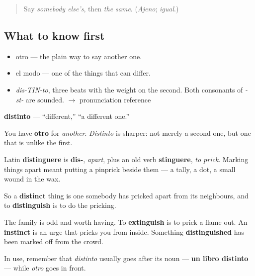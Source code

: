 \label{lesson:ES-C350-distinto}



\begin{quote}
Say \emph{somebody else's}, then \emph{the same}. (\emph{Ajeno}; \emph{igual}.)
\end{quote}

\subsection*{What to know first}
\begin{itemize}
\raggedright
  \item otro — the plain way to say another one.
  \item el modo — one of the things that can differ.
\end{itemize}

\begin{sounds}
\begin{itemize}
\raggedright
  \item \emph{dis-TIN-to}, three beats with the weight on the second. Both consonants of \emph{-st-} are sounded. $\to$ pronunciation reference
\end{itemize}
\end{sounds}

\begin{cousinweb}
\textbf{distinto} — \textquotedblleft{}different,\textquotedblright{} \textquotedblleft{}a different one.\textquotedblright{}

You have \textbf{otro} for \emph{another}. \emph{Distinto} is sharper: not merely a second one, but one that is unlike the first.

Latin \textbf{distinguere} is \textbf{dis-}, \emph{apart}, plus an old verb \textbf{stinguere}, \emph{to prick}. Marking things apart meant putting a pinprick beside them — a tally, a dot, a small wound in the wax.

So a \textbf{distinct} thing is one somebody has pricked apart from its neighbours, and to \textbf{distinguish} is to do the pricking.

The family is odd and worth having. To \textbf{extinguish} is to prick a flame out. An \textbf{instinct} is an urge that pricks you from inside. Something \textbf{distinguished} has been marked off from the crowd.

In use, remember that \emph{distinto} usually goes after its noun — \textbf{un libro distinto} — while \emph{otro} goes in front.
\end{cousinweb}


